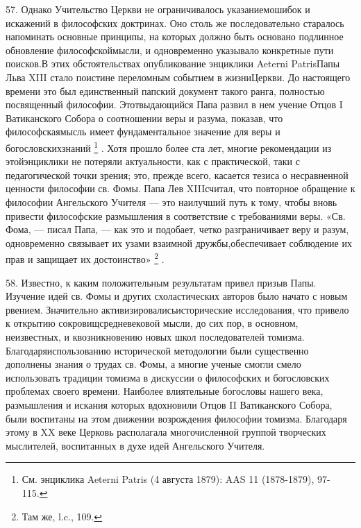 \documentclass[a5paper,10pt]{article}
\begin{document}
57. Однако Учительство Церкви не ограничивалось указаниемошибок и искажений в
философских доктринах. Оно столь же последовательно старалось напоминать
основные принципы, на которых должно быть основано подлинное обновление
философскоймысли, и одновременно указывало конкретные пути поисков.В этих
обстоятельствах опубликование энциклики Aeterni PatrisПапы Льва XIII стало
поистине переломным событием в жизниЦеркви. До настоящего времени это был
единственный папский документ такого ранга, полностью посвященный философии.
Этотвыдающийся Папа развил в нем учение Отцов I Ватиканского Собора о
соотношении веры и разума, показав, что философскаямысль имеет фундаментальное
значение для веры и богословскихзнаний \footnote{См. энциклика Aeterni Patris
(4 августа 1879): AAS 11 (1878-1879), 97-115.} . Хотя прошло более ста лет,
многие рекомендации из этойэнциклики не потеряли актуальности, как с
практической, таки с педагогической точки зрения; это, прежде всего, касается
тезиса о несравненной ценности философии св. Фомы. Папа Лев XIIIсчитал, что
повторное обращение к философии Ангельского Учителя — это наилучший путь к
тому, чтобы вновь привести философские размышления в соответствие с
требованиями веры. «Св.  Фома, — писал Папа, — как это и подобает, четко
разграничивает веру и разум, одновременно связывает их узами взаимной
дружбы,обеспечивает соблюдение их прав и защищает их достоинство» \footnote{Там
же, l.c., 109.} .

58. Известно, к каким положительным результатам привел призыв Папы. Изучение
идей св. Фомы и других схоластических авторов было начато с новым рвением.
Значительно активизировалисьисторические исследования, что привело к открытию
сокровищсредневековой мысли, до сих пор, в основном, неизвестных, и
квозникновению новых школ последователей томизма. Благодаряиспользованию
исторической методологии были существенно дополнены знания о трудах св. Фомы, а
многие ученые смогли смело использовать традиции томизма в дискуссии о
философских и богословских проблемах своего времени. Наиболее влиятельные
богословы нашего века, размышления и искания которых вдохновили Отцов II
Ватиканского Собора, были воспитаны на этом движении возрождения философии
томизма. Благодаря этому в XX веке Церковь располагала многочисленной группой
творческих мыслителей, воспитанных в духе идей Ангельского Учителя.
\end{document}
